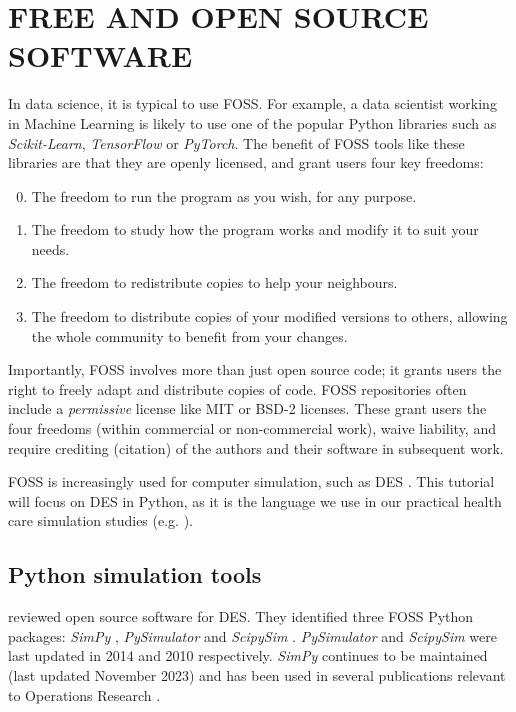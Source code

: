 \documentclass{swpaperproc}
\theoremstyle{sw}
\begin{document}
\section{FREE AND OPEN SOURCE SOFTWARE}

In data science, it is typical to use FOSS. For example, a data scientist working in Machine Learning is likely to use one of the popular Python libraries such as \textit{Scikit-Learn}, \textit{TensorFlow} or \textit{PyTorch}. The benefit of FOSS tools like these libraries are that they are openly licensed, and grant users four key freedoms:

\begin{enumerate}
\setcounter{enumi}{-1}
    \item The freedom to run the program as you wish, for any purpose.
    \item The freedom to study how the program works and modify it to suit your needs.
    \item The freedom to redistribute copies to help your neighbours.
    \item The freedom to distribute copies of your modified versions to others, allowing the whole community to benefit from your changes.
\end{enumerate}

Importantly, FOSS involves more than just open source code; it grants users the right to freely adapt and distribute copies of code. FOSS repositories often include a \textit{permissive} license like MIT or BSD-2 licenses.  These grant users the four freedoms (within commercial or non-commercial work), waive liability, and require crediting (citation) of the authors and their software in subsequent work.

FOSS is increasingly used for computer simulation, such as DES \cite{monks_harper_2023}. This tutorial will focus on DES in Python, as it is the language we use in our practical health care simulation studies (e.g. ).

\subsection{Python simulation tools}

 reviewed open source software for DES. They identified three FOSS Python packages: \textit{SimPy} \cite{simpy}, \textit{PySimulator} \cite{pfeiffer2012pysimulator} and \textit{ScipySim} \cite{mcinnes2011scipysim}. \textit{PySimulator} and \textit{ScipySim} were last updated in 2014 and 2010 respectively. \textit{SimPy} continues to be maintained (last updated November 2023) and has been used in several publications relevant to Operations Research . 
\end{document}
